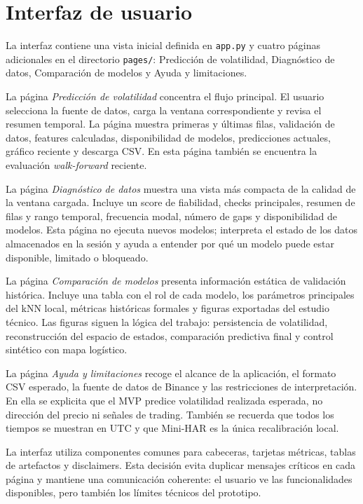 \section{Interfaz de usuario}\label{sec:interfaz-usuario}

La interfaz contiene una vista inicial definida en \texttt{app.py} y cuatro páginas adicionales en el directorio \texttt{pages/}: Predicción de volatilidad, Diagnóstico de datos, Comparación de modelos y Ayuda y limitaciones.

La página \textit{Predicción de volatilidad} concentra el flujo principal. El usuario selecciona la fuente de datos, carga la ventana correspondiente y revisa el resumen temporal. La página muestra primeras y últimas filas, validación de datos, features calculadas, disponibilidad de modelos, predicciones actuales, gráfico reciente y descarga CSV. En esta página también se encuentra la evaluación \textit{walk-forward} reciente.

La página \textit{Diagnóstico de datos} muestra una vista más compacta de la calidad de la ventana cargada. Incluye un score de fiabilidad, checks principales, resumen de filas y rango temporal, frecuencia modal, número de gaps y disponibilidad de modelos. Esta página no ejecuta nuevos modelos; interpreta el estado de los datos almacenados en la sesión y ayuda a entender por qué un modelo puede estar disponible, limitado o bloqueado.

La página \textit{Comparación de modelos} presenta información estática de validación histórica. Incluye una tabla con el rol de cada modelo, los parámetros principales del kNN local, métricas históricas formales y figuras exportadas del estudio técnico. Las figuras siguen la lógica del trabajo: persistencia de volatilidad, reconstrucción del espacio de estados, comparación predictiva final y control sintético con mapa logístico.

La página \textit{Ayuda y limitaciones} recoge el alcance de la aplicación, el formato CSV esperado, la fuente de datos de Binance y las restricciones de interpretación. En ella se explicita que el MVP predice volatilidad realizada esperada, no dirección del precio ni señales de trading. También se recuerda que todos los tiempos se muestran en UTC y que Mini-HAR es la única recalibración local.

La interfaz utiliza componentes comunes para cabeceras, tarjetas métricas, tablas de artefactos y disclaimers. Esta decisión evita duplicar mensajes críticos en cada página y mantiene una comunicación coherente: el usuario ve las funcionalidades disponibles, pero también los límites técnicos del prototipo.

